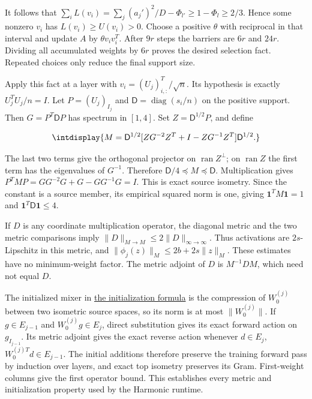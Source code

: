 
It follows that \(\sum_iL(v_i)=\sum_j(a_j')^2/D-\Phi_{l'} \ge1-\Phi_l\ge2/3\). Hence some nonzero \(v_i\) has \(L(v_i)\ge U(v_i)>0\). Choose a positive \(\theta\) with reciprocal in that interval and update \(A\) by \(\theta v_iv_i^T\). After \(9r\) steps the barriers are \(6r\) and \(24r\). Dividing all accumulated weights by \(6r\) proves the desired selection fact. Repeated choices only reduce the final support size.



Apply this fact at a layer with \(v_i=(U_j)_{i,\allowbreak :}^T/\sqrt n\). Its hypothesis is exactly \(U_j^TU_j/n=I\). Let \(P=(U_j)_{I_j}\) and \(\mathsf D=\operatorname{diag}(s_i/n)\) on the positive support. Then \(G=P^T\mathsf DP\) has spectrum in \([1,\allowbreak 4]\). Set \(Z=\mathsf D^{1/2}P\), and define


\begingroup\renewcommand{\theHequation}{intdisplay.571}
\begin{equation}
\intdisplay{
M=\mathsf D^{1/2}
 [ZG^{-2}Z^T+I-ZG^{-1}Z^T]\mathsf D^{1/2}.
}
\label{int:eq-0236-harmonic-source-metric-formula}
\end{equation}
\endgroup


The last two terms give the orthogonal projector on \(\operatorname{ran}Z^\perp\); on \(\operatorname{ran}Z\) the first term has the eigenvalues of \(G^{-1}\). Therefore \(\mathsf D/4\preceq M\preceq\mathsf D\). Multiplication gives \(P^TMP=GG^{-2}G+G-GG^{-1}G=I\). This is exact source isometry. Since the constant is a source member, its empirical squared norm is one, giving \(\mathbf1^TM\mathbf1=1\) and \(\mathbf1^T\mathsf D\mathbf1\le4\).



If \(D\) is any coordinate multiplication operator, the diagonal metric and the two metric comparisons imply \(\|D\|_{M\to M}\le2\|D\|_{\infty\to\infty}\). Thus activations are \(2s\)-Lipschitz in this metric, and \(\|\phi_j(z)\|_M\le2b+2s\|z\|_M\). These estimates have no minimum-weight factor. The metric adjoint of \(D\) is \(M^{-1}DM\), which need not equal \(D\).



The initialized mixer in \hyperref[int:harmonic-runtime-definition]{the initialization formula} is the compression of \(W_0^{(j)}\) between two isometric source spaces, so its norm is at most \(\|W_0^{(j)}\|\). If \(g\in E_{j-1}\) and \(W_0^{(j)}g\in E_j\), direct substitution gives its exact forward action on \(g_{I_{j-1}}\). Its metric adjoint gives the exact reverse action whenever \(d\in E_j\), \(W_0^{(j)T}d\in E_{j-1}\). The initial additions therefore preserve the training forward pass by induction over layers, and exact top isometry preserves its Gram. First-weight columns give the first operator bound. This establishes every metric and initialization property used by the Harmonic runtime.


